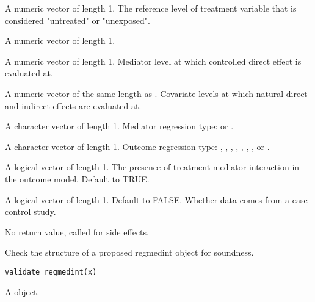 \documentclass[a4paper]{book}
\begin{document}
\begin{Arguments}
\begin{ldescription}
\item[\code{a0}] A numeric vector of length 1. The reference level of treatment variable that is considered "untreated" or "unexposed".

\item[\code{a1}] A numeric vector of length 1.

\item[\code{m\_cde}] A numeric vector of length 1. Mediator level at which controlled direct effect is evaluated at.

\item[\code{c\_cond}] A numeric vector of the same length as . Covariate levels at which natural direct and indirect effects are evaluated at.

\item[\code{mreg}] A character vector of length 1. Mediator regression type:  or .

\item[\code{yreg}] A character vector of length 1. Outcome regression type: , , , , , , , or .

\item[\code{interaction}] A logical vector of length 1. The presence of treatment-mediator interaction in the outcome model. Default to TRUE.

\item[\code{casecontrol}] A logical vector of length 1. Default to FALSE. Whether data comes from a case-control study.
\end{ldescription}
\end{Arguments}
%
\begin{Value}
No return value, called for side effects.
\end{Value}
%
\begin{Description}
Check the structure of a proposed regmedint object for soundness.
\end{Description}
%
\begin{Usage}
\begin{verbatim}
validate_regmedint(x)
\end{verbatim}
\end{Usage}
%
\begin{Arguments}
\begin{ldescription}
\item[\code{x}] A  object.
\end{ldescription}
\end{Arguments}
\end{document}

